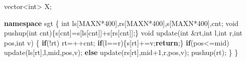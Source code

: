 \documentclass[
]{article}
\newenvironment{Shaded}{}{}
\newcommand{\ControlFlowTok}[1]{\textcolor[rgb]{0.00,0.44,0.13}{\textbf{#1}}}
\newcommand{\DataTypeTok}[1]{\textcolor[rgb]{0.56,0.13,0.00}{#1}}
\newcommand{\DecValTok}[1]{\textcolor[rgb]{0.25,0.63,0.44}{#1}}
\newcommand{\KeywordTok}[1]{\textcolor[rgb]{0.00,0.44,0.13}{\textbf{#1}}}
\newcommand{\NormalTok}[1]{#1}
\begin{document}
\begin{Shaded}
\begin{Highlighting}[]
\NormalTok{vector\textless{}}\DataTypeTok{int}\NormalTok{\textgreater{} X;}

\KeywordTok{namespace}\NormalTok{ sgt}
\NormalTok{\{}
    \DataTypeTok{int}\NormalTok{ ls[MAXN*}\DecValTok{400}\NormalTok{],rs[MAXN*}\DecValTok{400}\NormalTok{],s[MAXN*}\DecValTok{400}\NormalTok{],cnt;}
    \DataTypeTok{void}\NormalTok{ pushup(}\DataTypeTok{int}\NormalTok{ cnt)\{s[cnt]=s[ls[cnt]]+s[rs[cnt]];\}}
    \DataTypeTok{void}\NormalTok{ update(}\DataTypeTok{int}\NormalTok{ \&rt,}\DataTypeTok{int}\NormalTok{ l,}\DataTypeTok{int}\NormalTok{ r,}\DataTypeTok{int}\NormalTok{ pos,}\DataTypeTok{int}\NormalTok{ v)}
\NormalTok{    \{}
        \ControlFlowTok{if}\NormalTok{(!rt) rt=++cnt;}
        \ControlFlowTok{if}\NormalTok{(l==r)\{s[rt]+=v;}\ControlFlowTok{return}\NormalTok{;\}}
        \ControlFlowTok{if}\NormalTok{(pos\textless{}=mid) update(ls[rt],l,mid,pos,v);}
        \ControlFlowTok{else}\NormalTok{ update(rs[rt],mid+}\DecValTok{1}\NormalTok{,r,pos,v);}
\NormalTok{        pushup(rt);}
\NormalTok{    \}}
\NormalTok{\}}


\end{Highlighting}
\end{Shaded}
\end{document}
